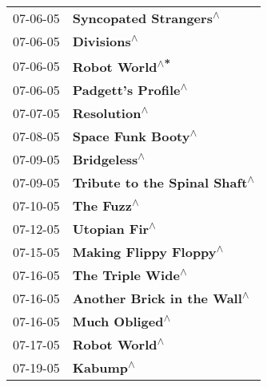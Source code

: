 \begin{supertabular}{p{0.25\columnwidth}p{0.75\columnwidth}}
 07-06-05 &                                                     \textbf{Syncopated Strangers\textsuperscript{$\wedge$}} \\
 07-06-05 &                                                                \textbf{Divisions\textsuperscript{$\wedge$}} \\
 07-06-05 &                                                             \textbf{Robot World\textsuperscript{$\wedge$*}} \\
 07-06-05 &                                                        \textbf{Padgett's Profile\textsuperscript{$\wedge$}} \\
 07-07-05 &                                                               \textbf{Resolution\textsuperscript{$\wedge$}} \\
 07-08-05 &                                                         \textbf{Space Funk Booty\textsuperscript{$\wedge$}} \\
 07-09-05 &                                                               \textbf{Bridgeless\textsuperscript{$\wedge$}} \\
 07-09-05 &                                              \textbf{Tribute to the Spinal Shaft\textsuperscript{$\wedge$}} \\
 07-10-05 &                                                                 \textbf{The Fuzz\textsuperscript{$\wedge$}} \\
 07-12-05 &                                                              \textbf{Utopian Fir\textsuperscript{$\wedge$}} \\
 07-15-05 &                                                     \textbf{Making Flippy Floppy\textsuperscript{$\wedge$}} \\
 07-16-05 &                                                          \textbf{The Triple Wide\textsuperscript{$\wedge$}} \\
 07-16-05 &                                                \textbf{Another Brick in the Wall\textsuperscript{$\wedge$}} \\
 07-16-05 &                                                             \textbf{Much Obliged\textsuperscript{$\wedge$}} \\
 07-17-05 &                                                              \textbf{Robot World\textsuperscript{$\wedge$}} \\
 07-19-05 &                                                                   \textbf{Kabump\textsuperscript{$\wedge$}} \\

\end{supertabular}
